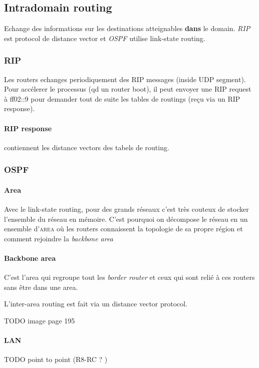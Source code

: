 \subsection{Intradomain routing}
Echange des informations sur les destinations atteignables \textbf{dans} le domain.
\textit{RIP} est protocol de distance vector et \textit{OSPF} utilise link-state routing.

\subsubsection{RIP}
Les routers echanges periodiquement des RIP messages (inside UDP segment).
Pour accélerer le processus (qd un router boot), il peut envoyer une RIP request à ff02::9
pour demander tout de suite les tables de routings (reçu via un RIP response).

\paragraph{RIP response} contiennent les distance vectors des tabels de routing.

\subsubsection{OSPF}

\paragraph{Area}
Avec le link-state routing, pour des grands réseaux c'est très couteux de stocker
l'ensemble du réseau en mémoire. C'est pourquoi on décompose le réseau en un
ensemble d'\textsc{area} où les routers connaissent la topologie de sa propre
région et comment rejoindre la \textit{backbone area}

\paragraph{Backbone area}
C'est l'area qui regroupe tout les \textit{border router} et ceux qui sont relié
à ces routers sans être dans une area.

L'inter-area routing est fait via un distance vector protocol.

TODO image page 195

\paragraph{LAN}
TODO point to point (R8-RC ? )


